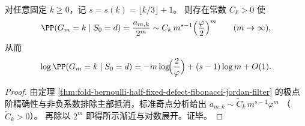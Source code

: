 \begin{corollary}\label{cor:fold-bernoulli-half-fixed-defect-boundary-ldp}
对任意固定 \(k\ge 0\)，记 \(s=s(k)=\lfloor k/3\rfloor+1\)。
则存在常数 \(C_k>0\) 使
\[
\PP(G_m=k\mid S_0=d)=\frac{a_{m,k}}{2^m}
\sim
C_k\,m^{s-1}\Bigl(\frac{\varphi}{2}\Bigr)^{m}
\qquad(m\to\infty),
\]
从而
\[
\log \PP(G_m=k\mid S_0=d)= -m\log\!\Bigl(\frac{2}{\varphi}\Bigr)+(s-1)\log m+O(1).
\]
\end{corollary}
\begin{proof}
由定理 \ref{thm:fold-bernoulli-half-fixed-defect-fibonacci-jordan-filter} 的极点阶精确性与非负系数排除主部抵消，标准奇点分析给出
\(
a_{m,k}\sim \widetilde C_k\,m^{s-1}\varphi^m
\)
（\(\widetilde C_k>0\)）。
再除以 \(2^m\) 即得所示渐近与对数展开。证毕。
\end{proof}

\endinput
